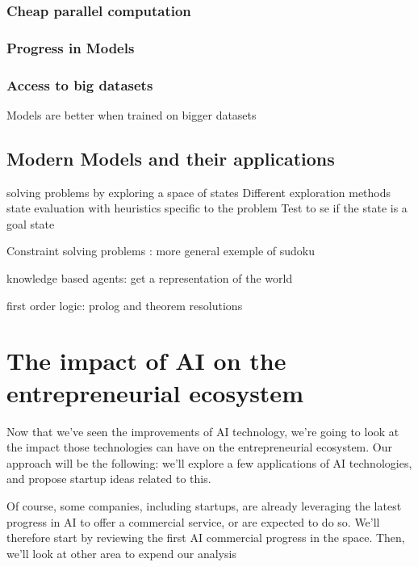 \documentclass[12pt]{article}
\begin{document}
\subsubsection{Cheap parallel computation}

\subsubsection{Progress in Models}

\subsubsection{Access to big datasets}

Models are better when trained on bigger datasets

\subsection{Modern Models and their applications}

solving problems by exploring a space of states
Different exploration methods
state evaluation with heuristics specific to the problem
Test to se if the state is a goal state

Constraint solving problems : more general
exemple of sudoku


knowledge based agents: get a representation of the world

first order logic: prolog and theorem resolutions

\pagebreak



\section{The impact of AI on the entrepreneurial ecosystem}

Now that we've seen the improvements of AI technology, we're going to look at
the impact those technologies can have on the entrepreneurial ecosystem.
Our approach will be the following: we'll explore a few applications of AI
technologies, and propose startup ideas related to this.

Of course, some companies, including startups, are already leveraging the latest
 progress in AI to offer a commercial service, or are expected to do so.
 We'll therefore start by reviewing the first AI commercial progress in the
 space. Then, we'll look at other area to expend our analysis
\end{document}
